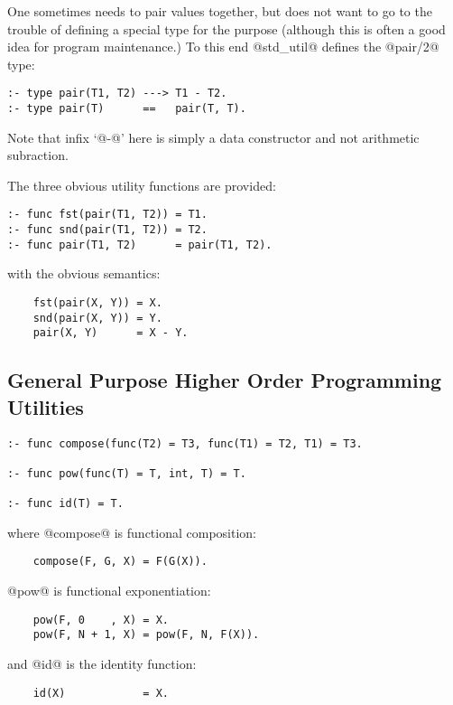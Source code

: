One sometimes needs to pair values together, but does not want to go to
the trouble of defining a special type for the purpose (although this is
often a good idea for program maintenance.)  To this end @std\_util@
defines the @pair/2@ type:
\begin{verbatim}
:- type pair(T1, T2) ---> T1 - T2.
:- type pair(T)      ==   pair(T, T).
\end{verbatim}
Note that infix `@-@' here is simply a data constructor and not
arithmetic subraction.


The three obvious utility functions are provided:
\begin{verbatim}
:- func fst(pair(T1, T2)) = T1.
:- func snd(pair(T1, T2)) = T2.
:- func pair(T1, T2)      = pair(T1, T2).
\end{verbatim}
with the obvious semantics:
\begin{verbatim}
    fst(pair(X, Y)) = X.
    snd(pair(X, Y)) = Y.
    pair(X, Y)      = X - Y.
\end{verbatim}

\subsection{General Purpose Higher Order Programming Utilities}

\begin{verbatim}
:- func compose(func(T2) = T3, func(T1) = T2, T1) = T3.

:- func pow(func(T) = T, int, T) = T.

:- func id(T) = T.
\end{verbatim}
where @compose@ is functional composition:
\begin{verbatim}
    compose(F, G, X) = F(G(X)).
\end{verbatim}
@pow@ is functional exponentiation:
\begin{verbatim}
    pow(F, 0    , X) = X.
    pow(F, N + 1, X) = pow(F, N, F(X)).
\end{verbatim}
and @id@ is the identity function:
\begin{verbatim}
    id(X)            = X.
\end{verbatim}

